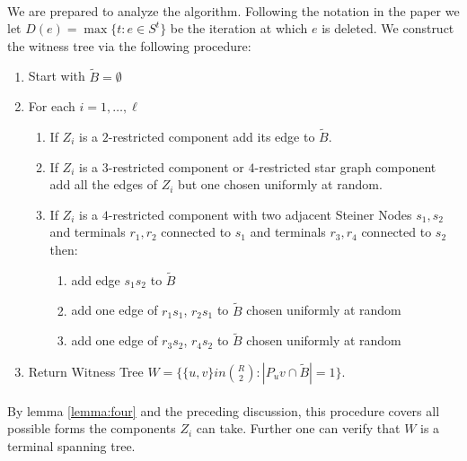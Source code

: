 \documentclass[letterpaper,12pt,oneside,onecolumn]{article}
\begin{document}
\paragraph{}
We are prepared to analyze the algorithm. Following the notation in the paper we let $D(e) = \max\{t : e \in S^t\}$ be the iteration at which $e$ is deleted. We construct the witness tree via the following procedure:
\begin{enumerate}
\item Start with $\tilde{B} = \emptyset$
\item For each $i = 1,\dots, \ell$
	\begin{enumerate}
	\item If $Z_i$ is a $2$-restricted component add its edge to $\tilde{B}$.
	\item If $Z_i$ is a $3$-restricted component or $4$-restricted star graph component add all the edges of $Z_i$ but one chosen uniformly at random.
	\item If $Z_i$ is a $4$-restricted component with two adjacent Steiner Nodes $s_1,s_2$ and terminals $r_1, r_2$ connected to $s_1$ and terminals $r_3,r_4$ connected to $s_2$ then:
	\begin{enumerate}
		 \item add edge $s_1s_2$ to $\tilde{B}$
		 \item add one edge of $r_1s_1$, $r_2s_1$ to $\tilde{B}$ chosen uniformly at random
		 \item add one edge of $r_3s_2$, $r_4s_2$ to $\tilde{B}$ chosen uniformly at random
\end{enumerate}
	\end{enumerate}
\item Return Witness Tree $W= \{\{u,v\} in {R\choose 2} : |P_uv \cap \tilde{B}| = 1\}$.
\end{enumerate}
\paragraph{}
By lemma \ref{lemma:four} and the preceding discussion, this procedure covers all possible forms the components $Z_i$ can take. Further one can verify that $W$ is a terminal spanning tree. 
\end{document}
